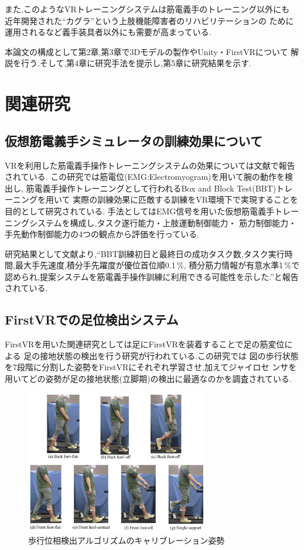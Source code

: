 \documentclass{ltjsreport}
\begin{document}
		また,このようなVRトレーニングシステムは筋電義手のトレーニング以外にも
		近年開発された``カグラ''\cite{ref:5}という上肢機能障害者のリハビリテーションの
		ために運用されるなど義手装具者以外にも需要が高まっている.

		本論文の構成として第2章,第3章で3Dモデルの製作やUnity・FirstVRについて
		解説を行う.そして,第4章に研究手法を提示し,第5章に研究結果を示す.

	\section{関連研究}
		\subsection{仮想筋電義手シミュレータの訓練効果について}
		VRを利用した筋電義手操作トレーニングシステムの効果については文献\cite{ref:1}で報告されている.
		この研究では筋電位(EMG:Electromyogram)を用いて腕の動作を検出し,
		筋電義手操作トレーニングとして行われるBox and Block Test(BBT)トレーニングを用いて
		実際の訓練効果に匹敵する訓練をVR環境下で実現することを目的として研究されている.
		手法としてはEMG信号を用いた仮想筋電義手トレーニングシステムを構成し,タスク遂行能力・上肢運動制御能力・
		筋力制御能力・手先動作制御能力の4つの観点から評価を行っている.

		研究結果として文献\cite{ref:1}より,``BBT訓練初日と最終日の成功タスク数,タスク実行時間,最大手先速度,積分手先躍度が優位首位順0.1\,\%,
		積分筋力情報が有意水準1\,\%で認められ,提案システムを筋電義手操作訓練に利用できる可能性を示した.''と報告されている.



		\subsection{FirstVRでの足位検出システム}
		FirstVRを用いた関連研究としては足にFirstVRを装着することで足の筋変位による
		足の接地状態の検出を行う研究\cite{ref:6}が行われている.この研究では
		図の歩行状態を7段階に分割した姿勢をFirstVRにそれぞれ学習させ,加えてジャイロセ
		ンサを用いてどの姿勢が足の接地状態(立脚期)の検出に最適なのかを調査されている.
		\begin{figure}[H]
		\centering
		\includegraphics[width = 8cm]{../figs/sensors-21-01081-g004.jpg}
		\hspace{-32truemm}
		\caption{歩行位相検出アルゴリズムのキャリブレーション姿勢}
		\label{fig:RR-FVRcalibration}
		\end{figure}
\end{document}

